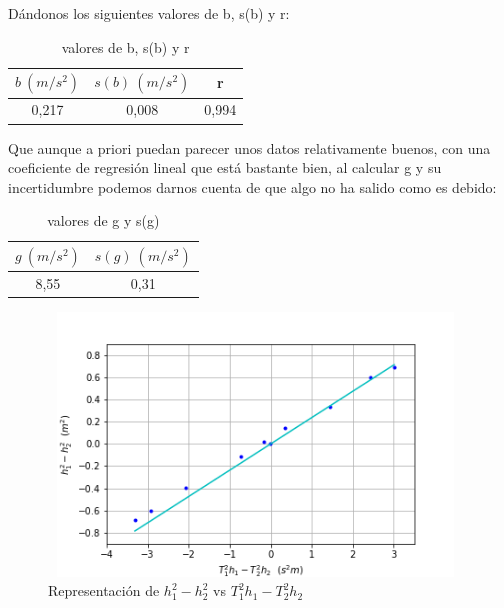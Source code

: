 \documentclass[12pt,a4paper]{book}
\begin{document}
Dándonos los siguientes valores de b, s(b) y r:


\begin{table}[h!] %
\begin{center}
\begin{tabular}{|c|c|c|}
\hline
$b \ (m/s^2) $ & 	 $s(b) \ (m/s^2)$ & 	 r \\ \hline
0,217 & 	 0,008 & 	 0,994 \\
\hline
\end{tabular}
\label{Tab: valor de h y T }
\caption{valores de b, s(b) y r}
\end{center}
\end{table}

Que aunque a priori puedan parecer unos datos relativamente buenos, con una coeficiente de regresión lineal que está bastante bien, al calcular g y su incertidumbre podemos darnos cuenta de que algo no ha salido como es debido:

\begin{table}[h!] %
\begin{center}
\begin{tabular}{|c|c|}
\hline
$g \ (m/s^2) $ & 	 $s(g) \ (m/s^2)$ \\  \hline
8,55 & 	 0,31 \\ 
\hline
\end{tabular}
\label{Tab: valor de h y T }
\caption{valores de g y s(g)}
\end{center}
\end{table}
 
\begin{figure}[h!]
\centering
\includegraphics[width=11cm, height=7cm]{Plot1-Kater.png}
\caption{Representación de $h_1^2-h_2^2$ vs $T_1^2h_1-T_2^2h_2$}
\label{fig:Plot1-kater}
\end{figure}
\end{document}
